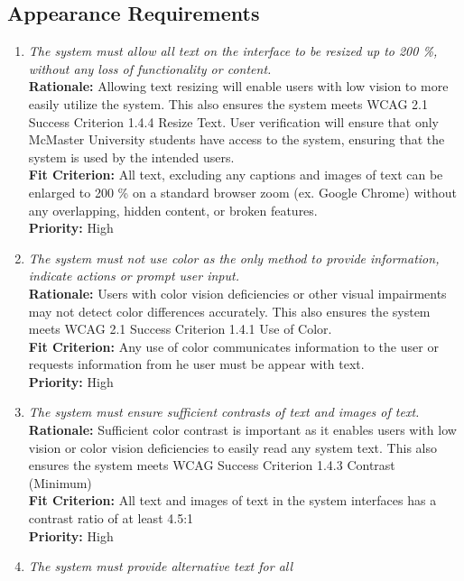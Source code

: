 \documentclass[12pt]{article}
\begin{document}
\subsection{Appearance Requirements}
\begin{enumerate}[label=LFR-AR \arabic*., wide=0pt, leftmargin=*]
  \item \emph{The system must allow all text on the interface to be
    resized up to 200 \%, without any loss of functionality or content. }\\[2mm]
    {\bf Rationale:} Allowing text resizing will enable users with
    low vision to more easily utilize the system. This also ensures
    the system meets WCAG 2.1 Success Criterion 1.4.4 Resize Text.
    User verification will ensure that only McMaster University
    students have access to the system, ensuring that the system is
    used by the intended users.  \\
    {\bf Fit Criterion:} All text, excluding any captions and images
    of text can be enlarged to 200 \% on a standard browser zoom (ex.
    Google Chrome) without any overlapping, hidden content, or broken
    features.  \\
    {\bf Priority:} High
  \item \emph{The system must not use color as the only method to
    provide information, indicate actions or prompt user input.}\\[2mm]
    {\bf Rationale:} Users with color vision deficiencies or other
    visual impairments may not detect color differences accurately.
    This also ensures the system meets WCAG 2.1 Success Criterion
    1.4.1 Use of Color.\\
    {\bf Fit Criterion:} Any use of color communicates information to
    the user or requests information from he user must be appear with text.  \\
    {\bf Priority:} High
  \item \emph{The system must ensure sufficient contrasts of text and
    images of text.}\\[2mm]
    {\bf Rationale:} Sufficient color contrast is important as it
    enables users with low vision or color vision deficiencies to
    easily read any system text. This also ensures the system meets
    WCAG Success Criterion 1.4.3 Contrast (Minimum)\\
    {\bf Fit Criterion:}  All text and images of text in the system
    interfaces has a contrast ratio of at least 4.5:1  \\
    {\bf Priority:} High
  \item \emph{The system must provide alternative text for all
}
\end{enumerate}
\end{document}
